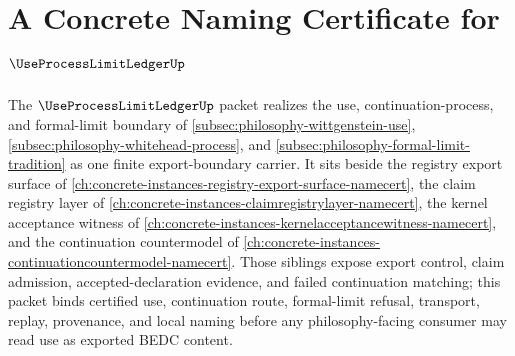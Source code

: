 \chapter{A Concrete Naming Certificate for $\UseProcessLimitLedgerUp$}
\label{ch:concrete-instances-use-process-limit-ledger-namecert}

The $\UseProcessLimitLedgerUp$ packet realizes the use, continuation-process, and formal-limit boundary of \autoref{subsec:philosophy-wittgenstein-use}, \autoref{subsec:philosophy-whitehead-process}, and \autoref{subsec:philosophy-formal-limit-tradition} as one finite export-boundary carrier. It sits beside the registry export surface of \autoref{ch:concrete-instances-registry-export-surface-namecert}, the claim registry layer of \autoref{ch:concrete-instances-claimregistrylayer-namecert}, the kernel acceptance witness of \autoref{ch:concrete-instances-kernelacceptancewitness-namecert}, and the continuation countermodel of \autoref{ch:concrete-instances-continuationcountermodel-namecert}. Those siblings expose export control, claim admission, accepted-declaration evidence, and failed continuation matching; this packet binds certified use, continuation route, formal-limit refusal, transport, replay, provenance, and local naming before any philosophy-facing consumer may read use as exported BEDC content.

